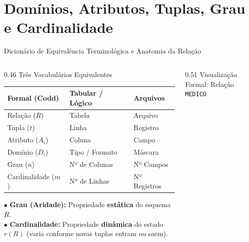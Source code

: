 \section[Anatomia da Relação]{Domínios, Atributos, Tuplas, Grau e Cardinalidade}

\begin{frame}{Dicionário de Equivalência Terminológica e Anatomia da Relação}
  \vspace{-0.1cm}
  \begin{columns}[t]
    \begin{column}{0.46\textwidth}
      \alert{Três Vocabulários Equivalentes}\par
      \vspace{0.1cm}
      \scriptsize
      \begin{tabular}{lll}
        \toprule
        \textbf{Formal (Codd)} & \textbf{Tabular / Lógico} & \textbf{Arquivos} \\
        \midrule
        Relação ($R$) & Tabela & Arquivo \\
        Tupla ($t$) & Linha & Registro \\
        Atributo ($A_i$) & Coluna & Campo \\
        Domínio ($D_i$) & Tipo / Formato & Máscara \\
        Grau ($n$) & Nº de Colunas & Nº Campos \\
        Cardinalidade ($m$) & Nº de Linhas & Nº Registros \\
        \bottomrule
      \end{tabular}
      \vspace{0.15cm}\par
      $\bullet$ \textbf{Grau (Aridade):} Propriedade \textbf{estática} do esquema $R$.\\
      $\bullet$ \textbf{Cardinalidade:} Propriedade \textbf{dinâmica} do estado $r(R)$ (varia conforme novas tuplas entram ou saem).
    \end{column}
    \begin{column}{0.51\textwidth}
      \alert{Visualização Formal: Relação \texttt{MEDICO}}\par
      \vspace{0.1cm}
      \begin{center}
\end{center}
\end{column}
\end{columns}
\end{frame}
